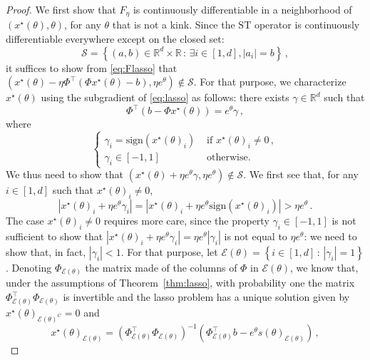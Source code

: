 \documentclass{article}
\def\cS{{\mathcal{S}}}
\def\cE{{\mathcal{E}}}
\def\RR{{\mathbb R}}
\def\sign{{\text{sign}}}
\def\ST{{\text{ST}}}
\def\dataMatrix{\Phi}
\begin{document}
\begin{proof}
We first show that $F_\eta$ is continuously differentiable in a neighborhood of $(x^\star(\theta),\theta)$, for any $\theta$ that is not a kink. Since the $\ST$ operator is continuously differentiable everywhere except on the closed set: 
$$
\cS = \left\{(a,b)\in\RR^d\times \RR\,:\,\exists i\in[1,d], |a_i| = b\right\}\,,
$$
it suffices to show from \eqref{eq:Flasso} that $(x^\star(\theta) - \eta \dataMatrix^\top(\dataMatrix x^\star(\theta)-b),\eta e^\theta) \notin \cS$. For that purpose, we  characterize $x^\star(\theta)$ using the subgradient of \eqref{eq:lasso} as follows: there exists $\gamma\in\RR^d$ such that
$$
\dataMatrix^\top\left(b - \dataMatrix x^\star(\theta)\right) = e^\theta \gamma\,,
$$
where
$$
\begin{cases}
\gamma_i = \sign(x^\star(\theta)_i) & \text{ if } x^\star(\theta)_i \neq 0\,,\\
\gamma_i \in [-1,1]& \text{ otherwise.}
\end{cases}
$$
We thus need to show that $(x^\star(\theta) + \eta e^\theta \gamma,\eta e^\theta) \notin \cS$. We first see that, for any $i\in[1,d]$ such that $x^\star(\theta)_i \neq 0$,
    $$
    |x^\star(\theta)_i + \eta e^\theta \gamma_i| = |x^\star(\theta)_i + \eta e^\theta \sign(x^\star(\theta)_i)| > \eta e^\theta\,.
    $$
The case $x^\star(\theta)_i \neq 0$ requires more care, since the property $\gamma_i \in [-1,1]$ is not sufficient to show that $|x^\star(\theta)_i + \eta e^\theta \gamma_i| = \eta e^\theta |\gamma_i|$ is not equal to $\eta e^\theta$: we need to show that, in fact, $|\gamma_i|<1$. For that purpose, let $\cE(\theta) = \left\{i\in[1,d]\,:\,|\gamma_i| = 1 \right\}$. Denoting $\dataMatrix_{\cE(\theta)}$ the matrix made of the columns of $\dataMatrix$ in $\cE(\theta)$, we know that, under the assumptions of Theorem~\ref{thm:lasso}, with probability one the matrix $\dataMatrix_{\cE(\theta)}^\top \dataMatrix_{\cE(\theta)}$ is invertible and the lasso problem has a unique solution given by $x^\star(\theta)_{\cE(\theta)^C} = 0$ and 
\begin{equation}\label{eq:xstarlasso}
x^\star(\theta)_{\cE(\theta)} = (\dataMatrix_{\cE(\theta)}^\top \dataMatrix_{\cE(\theta)})^{-1} \left(\dataMatrix_{\cE(\theta)}^\top b - e^\theta s(\theta)_{\cE(\theta)}\right)\,,
\end{equation}

\end{proof}
\end{document}
